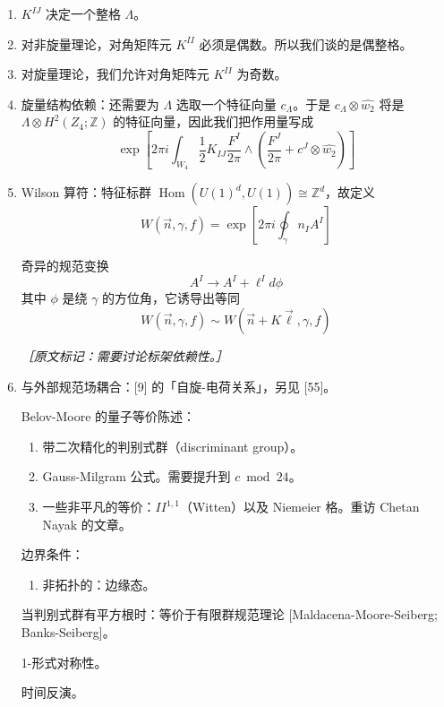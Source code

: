 \begin{enumerate}
  \item $K^{IJ}$ 决定一个整格 $\Lambda$。

  \item 对非旋量理论，对角矩阵元 $K^{II}$ 必须是偶数。所以我们谈的是偶整格。

  \item 对旋量理论，我们允许对角矩阵元 $K^{II}$ 为奇数。

  \item 旋量结构依赖：还需要为 $\Lambda$ 选取一个特征向量 $c_\Lambda$。于是 $c_\Lambda\otimes\widehat{w_2}$ 将是 $\Lambda\otimes H^2(Z_4;\mathbb{Z})$ 的特征向量，因此我们把作用量写成
  \begin{equation}
    \exp\left[2\pi i\int_{W_4}\frac12K_{IJ}\frac{F^I}{2\pi}\wedge
    \left(\frac{F^J}{2\pi}+c^J\otimes\widehat{w_2}\right)\right]
    \tag{2.358}
    \label{eq:2.358}
  \end{equation}

  \item Wilson 算符：特征标群 $\operatorname{Hom}(U(1)^d,U(1))\cong\mathbb{Z}^d$，故定义
  \begin{equation}
    W(\vec n,\gamma,f)=\exp\left[2\pi i\oint_\gamma n_IA^I\right]
    \tag{2.359}
    \label{eq:2.359}
  \end{equation}

  奇异的规范变换
  \begin{equation}
    A^I\to A^I+\ell^Id\phi
    \tag{2.360}
    \label{eq:2.360}
  \end{equation}
  其中 $\phi$ 是绕 $\gamma$ 的方位角，它诱导出等同
  \begin{equation}
    W(\vec n,\gamma,f)\sim W(\vec n+K\vec\ell,\gamma,f)
    \tag{2.361}
    \label{eq:2.361}
  \end{equation}

  {\small\itshape ［原文标记：需要讨论标架依赖性。］}

  \item 与外部规范场耦合：[9] 的「自旋-电荷关系」，另见 [55]。

  Belov-Moore 的量子等价陈述：
  \begin{enumerate}
    \item 带二次精化的判别式群（discriminant group）。
    \item Gauss-Milgram 公式。需要提升到 $c\bmod 24$。
    \item 一些非平凡的等价：$II^{1,1}$（Witten）以及 Niemeier 格。重访 Chetan Nayak 的文章。
  \end{enumerate}

  边界条件：
  \begin{enumerate}
    \item 非拓扑的：边缘态。
  \end{enumerate}

  当判别式群有平方根时：等价于有限群规范理论 [Maldacena-Moore-Seiberg; Banks-Seiberg]。

  1-形式对称性。

  时间反演。
\end{enumerate}

